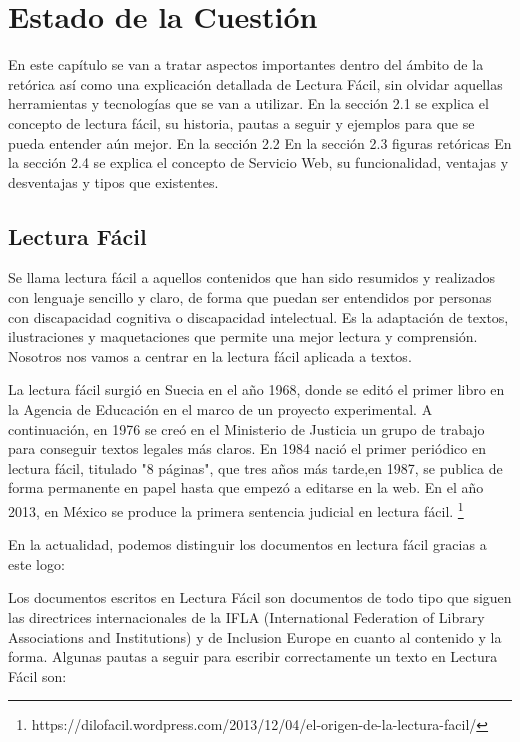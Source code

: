 \chapter{Estado de la Cuestión}
\label{cap:estadoDeLaCuestion}

\begin{resumen}
	En este capítulo se van a tratar aspectos importantes dentro del ámbito de la retórica así como una explicación detallada de Lectura Fácil, sin olvidar aquellas herramientas y tecnologías que se van a utilizar.
	En la sección 2.1 se explica el concepto de lectura fácil, su historia, pautas a seguir y ejemplos para que se pueda entender aún mejor. 
	En la sección 2.2
	En la sección 2.3 figuras retóricas
	En la sección 2.4 se explica el concepto de Servicio Web, su funcionalidad, ventajas y desventajas y tipos que existentes.
	
\end{resumen}



\section{Lectura Fácil}

Se llama lectura fácil a aquellos contenidos que han sido resumidos y realizados con lenguaje sencillo y claro, de forma que puedan ser entendidos por personas con discapacidad cognitiva o discapacidad intelectual. Es la adaptación de textos, ilustraciones y maquetaciones que permite una mejor lectura y comprensión.
Nosotros nos vamos a centrar en la lectura fácil aplicada a textos.

La lectura fácil surgió en Suecia en el año 1968, donde se editó el primer libro en la Agencia de Educación en el marco de un proyecto experimental. A continuación, en 1976 se creó en el Ministerio de Justicia un grupo de trabajo para conseguir textos legales más claros.
En 1984 nació el primer periódico en lectura fácil, titulado "8 páginas", que tres años más tarde,en 1987, se publica de forma permanente en papel hasta que empezó a editarse en la web. 
En el año 2013, en México se produce la primera sentencia judicial en lectura fácil.
\footnote{https://dilofacil.wordpress.com/2013/12/04/el-origen-de-la-lectura-facil/}

En la actualidad, podemos distinguir los documentos en lectura fácil gracias a este logo:
	
	
Los documentos escritos en Lectura Fácil son documentos de todo tipo que siguen las directrices internacionales de la IFLA (International Federation of Library Associations and Institutions) y de Inclusion Europe en cuanto al contenido y la forma.
Algunas pautas a seguir para escribir correctamente un texto en Lectura Fácil son:
\citep{GarcíaMuñoz2012LecturaFacil}


